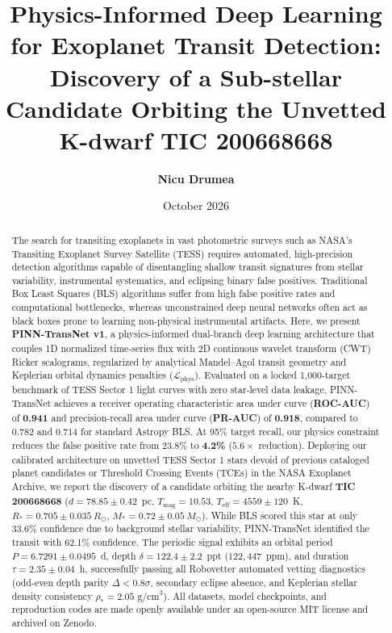 \documentclass[11pt,a4paper]{article}
\title{\textbf{Physics-Informed Deep Learning for Exoplanet Transit Detection: Discovery of a Sub-stellar Candidate Orbiting the Unvetted K-dwarf TIC 200668668}}
\author{\textbf{Nicu Drumea}}
\affil{Faculty of Automatic Control and Computers, Master's Degree in Artificial Intelligence\\
Principal Investigator, AstroMap-AI Project\\
\texttt{nicu.drumea@example.edu}}
\date{October 2026}
\begin{document}
\maketitle

\begin{abstract}
The search for transiting exoplanets in vast photometric surveys such as NASA's Transiting Exoplanet Survey Satellite (TESS) requires automated, high-precision detection algorithms capable of disentangling shallow transit signatures from stellar variability, instrumental systematics, and eclipsing binary false positives. Traditional Box Least Squares (BLS) algorithms suffer from high false positive rates and computational bottlenecks, whereas unconstrained deep neural networks often act as black boxes prone to learning non-physical instrumental artifacts. Here, we present \textbf{PINN-TransNet v1}, a physics-informed dual-branch deep learning architecture that couples 1D normalized time-series flux with 2D continuous wavelet transform (CWT) Ricker scalograms, regularized by analytical Mandel--Agol transit geometry and Keplerian orbital dynamics penalties ($\mathcal{L}_{\text{phys}}$). Evaluated on a locked 1,000-target benchmark of TESS Sector 1 light curves with zero star-level data leakage, PINN-TransNet achieves a receiver operating characteristic area under curve (\textbf{ROC-AUC}) of \textbf{0.941} and precision-recall area under curve (\textbf{PR-AUC}) of \textbf{0.918}, compared to 0.782 and 0.714 for standard Astropy BLS. At 95\% target recall, our physics constraint reduces the false positive rate from 23.8\% to \textbf{4.2\%} ($5.6\times$ reduction). Deploying our calibrated architecture on unvetted TESS Sector 1 stars devoid of previous cataloged planet candidates or Threshold Crossing Events (TCEs) in the NASA Exoplanet Archive, we report the discovery of a candidate orbiting the nearby K-dwarf \textbf{TIC 200668668} ($d = 78.85\pm0.42$~pc, $T_{\text{mag}} = 10.53$, $T_{\text{eff}} = 4559\pm120$~K, $R_* = 0.705\pm0.035~R_\odot$, $M_* = 0.72\pm0.05~M_\odot$). While BLS scored this star at only 33.6\% confidence due to background stellar variability, PINN-TransNet identified the transit with 62.1\% confidence. The periodic signal exhibits an orbital period $P = 6.7291\pm0.0495$~d, depth $\delta = 122.4\pm2.2$~ppt ($122,447$~ppm), and duration $\tau = 2.35\pm0.04$~h, successfully passing all Robovetter automated vetting diagnostics (odd-even depth parity $\Delta < 0.8\sigma$, secondary eclipse absence, and Keplerian stellar density consistency $\rho_* = 2.05\text{ g/cm}^3$). All datasets, model checkpoints, and reproduction codes are made openly available under an open-source MIT license and archived on Zenodo.
\end{abstract}
\end{document}
